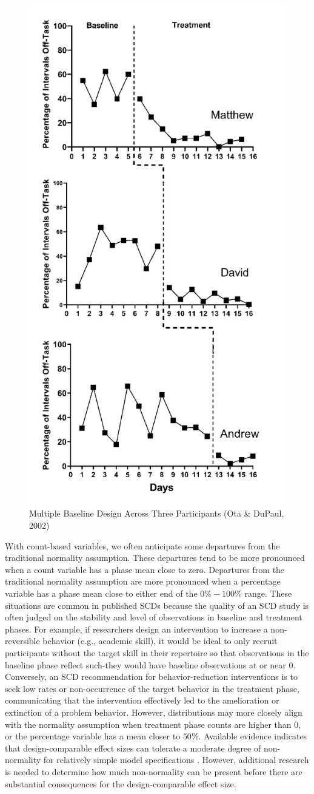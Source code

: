 \documentclass[
]{book}
\begin{document}
\begin{figure}
\includegraphics[width=0.5\linewidth]{images/Ota-DuPaul-2002} \caption{Multiple Baseline Design Across Three Participants (Ota \& DuPaul, 2002)}\label{fig:Ota-DuPaul-2002}
\end{figure}

With count-based variables, we often anticipate some departures from the traditional normality assumption. These departures tend to be more pronounced when a count variable has a phase mean close to zero. Departures from the traditional normality assumption are more pronounced when a percentage variable has a phase mean close to either end of the \(0\%-100\%\) range. These situations are common in published SCDs because the quality of an SCD study is often judged on the stability and level of observations in baseline and treatment phases. For example, if researchers design an intervention to increase a non-reversible behavior (e.g., academic skill), it would be ideal to only recruit participants without the target skill in their repertoire so that observations in the baseline phase reflect such-they would have baseline observations at or near 0. Conversely, an SCD recommendation for behavior-reduction interventions is to seek low rates or non-occurrence of the target behavior in the treatment phase, communicating that the intervention effectively led to the amelioration or extinction of a problem behavior. However, distributions may more closely align with the normality assumption when treatment phase counts are higher than 0, or the percentage variable has a mean closer to \(50\%\). Available evidence indicates that design-comparable effect sizes can tolerate a moderate degree of non-normality for relatively simple model specifications \citep{Chen_Chen_Yang_Chiang_Hsieh_Cheng_Ding_Wu_Peng_2023}. However, additional research is needed to determine how much non-normality can be present before there are substantial consequences for the design-comparable effect size.
\end{document}
